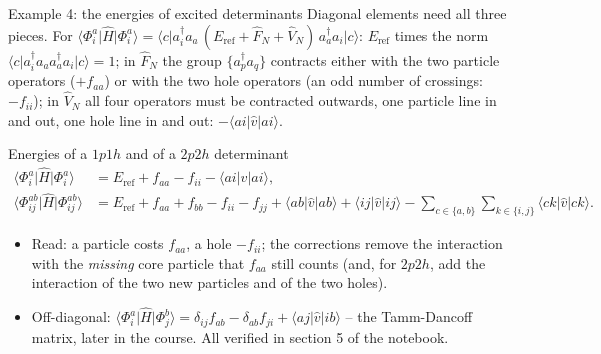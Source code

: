 \documentclass[aspectratio=169,10pt]{beamer}
\newcommand{\ket}[1]{\vert #1\rangle}
\newcommand{\bra}[1]{\langle #1\vert}
\newcommand{\element}[3]{\langle #1\vert #2\vert #3\rangle}
\newcommand{\nc}[1]{\bigl\{#1\bigr\}}
\begin{document}
\begin{frame}{Example 4: the energies of excited determinants}
  \small
  Diagonal elements need all three pieces. For $\bra{\Phi_i^a}\hat{H}\ket{\Phi_i^a}=\bra{c}a_i^{\dagger}a_a\,(E_{\mathrm{ref}}+\hat{F}_N+\hat{V}_N)\,a_a^{\dagger}a_i\ket{c}$: $E_{\mathrm{ref}}$ times the norm $\bra{c}a_i^{\dagger}a_aa_a^{\dagger}a_i\ket{c}=1$; in $\hat{F}_N$ the group $\nc{a_p^{\dagger}a_q}$ contracts either with the two particle operators ($+f_{aa}$) or with the two hole operators (an odd number of crossings: $-f_{ii}$); in $\hat{V}_N$ all four operators must be contracted outwards, one particle line in and out, one hole line in and out: $-\element{ai}{\hat{v}}{ai}$.
  \begin{block}{Energies of a $1p1h$ and of a $2p2h$ determinant}
    \begin{align*}
      \bra{\Phi_i^a}\hat{H}\ket{\Phi_i^a}&=E_{\mathrm{ref}}+f_{aa}-f_{ii}-\element{ai}{\hat{v}}{ai},\\
      \bra{\Phi_{ij}^{ab}}\hat{H}\ket{\Phi_{ij}^{ab}}&=E_{\mathrm{ref}}+f_{aa}+f_{bb}-f_{ii}-f_{jj}
      +\element{ab}{\hat{v}}{ab}+\element{ij}{\hat{v}}{ij}
      -\sum_{c\in\{a,b\}}\sum_{k\in\{i,j\}}\element{ck}{\hat{v}}{ck}.
    \end{align*}
  \end{block}
  \begin{itemize}
    \item Read: a particle costs $f_{aa}$, a hole $-f_{ii}$; the corrections remove the interaction with the \emph{missing} core particle that $f_{aa}$ still counts (and, for $2p2h$, add the interaction of the two new particles and of the two holes).
    \item Off-diagonal: $\bra{\Phi_i^a}\hat{H}\ket{\Phi_j^b}=\delta_{ij}f_{ab}-\delta_{ab}f_{ji}+\element{aj}{\hat{v}}{ib}$ -- the \alert{Tamm-Dancoff} matrix, later in the course. All verified in section 5 of the notebook.
  \end{itemize}
\end{frame}
\end{document}
